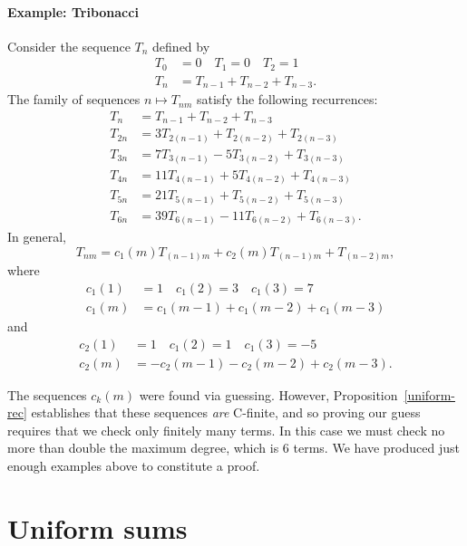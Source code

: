 \documentclass[12pt]{article}
\begin{document}
\paragraph{Example: Tribonacci} Consider the sequence $T_n$ defined by
\begin{align*}
    T_0 &= 0 \quad T_1 = 0 \quad T_2 = 1 \\
    T_n &= T_{n - 1} + T_{n - 2} + T_{n - 3}.
\end{align*}
The family of sequences $n \mapsto T_{nm}$ satisfy the following recurrences:
\begin{align*}
    T_{n} &= T_{n - 1} + T_{n - 2} + T_{n - 3} \\
    T_{2n} &= 3 T_{2(n - 1)} + T_{2(n - 2)} + T_{2(n - 3)} \\
    T_{3n} &= 7 T_{3(n - 1)} - 5 T_{3(n - 2)} + T_{3(n - 3)} \\
    T_{4n} &= 11 T_{4(n - 1)} + 5 T_{4(n - 2)} + T_{4(n - 3)} \\
    T_{5n} &= 21 T_{5(n - 1)} + T_{5(n - 2)} + T_{5(n - 3)} \\
    T_{6n} &= 39 T_{6(n - 1)} - 11 T_{6(n - 2)} + T_{6(n - 3)}.
\end{align*}
In general,
\begin{equation*}
    T_{nm} = c_1(m) T_{(n - 1)m} + c_2(m) T_{(n - 1)m} + T_{(n - 2)m},
\end{equation*}
where
\begin{align*}
    c_1(1) &= 1 \quad c_1(2) = 3 \quad c_1(3) = 7 \\
    c_1(m) &= c_1(m - 1) + c_1(m - 2) + c_1(m - 3)
\end{align*}
and
\begin{align*}
    c_2(1) &= 1 \quad c_1(2) = 1 \quad c_1(3) = -5 \\
    c_2(m) &= -c_2(m - 1) - c_2(m - 2) + c_2(m - 3).
\end{align*}

The sequences $c_k(m)$ were found via guessing. However,
Proposition~\ref{uniform-rec} establishes that these sequences \emph{are}
C-finite, and so proving our guess requires that we check only finitely many
terms. In this case we must check no more than double the maximum degree, which
is 6 terms. We have produced just enough examples above to constitute a proof.

\section{Uniform sums}%
\label{sec:uniform_sums}
\end{document}
